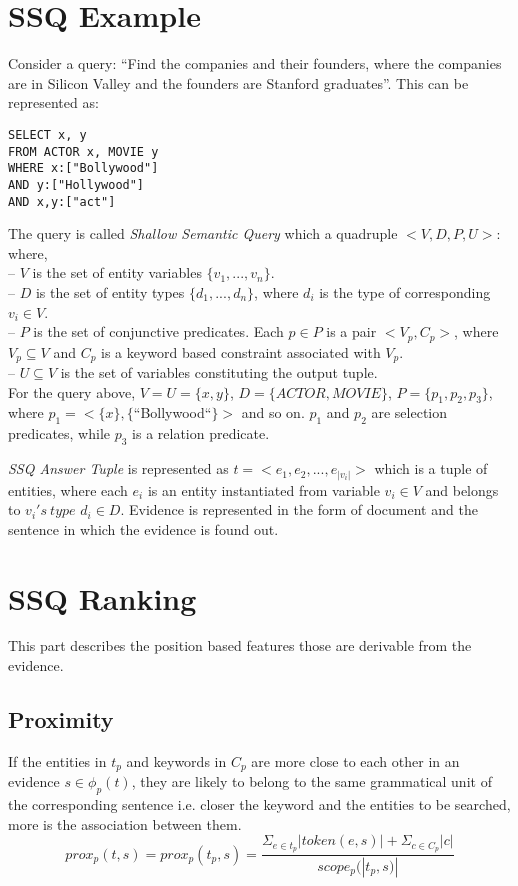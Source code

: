 \documentclass[11pt]{report}
\begin{document}
\section{SSQ Example}
Consider a query: ``Find the companies and their founders, where the companies are in Silicon Valley
and the founders are Stanford graduates''. This can be represented as:\\
\begin{verbatim}
SELECT x, y
FROM ACTOR x, MOVIE y
WHERE x:["Bollywood"]
AND y:["Hollywood"]
AND x,y:["act"]
\end{verbatim}
The query is called \textit{Shallow Semantic Query} which a quadruple $<V,D,P,U>$: where,\\
-- $V$ is the set of entity variables $\{v_{1},...,v_{n}\}$.\\
-- $D$ is the set of entity types $\{ d_{1},...,d_{n}\}$, where $d_{i}$ is the type of corresponding
$v_{i} \in V$. \\
-- $P$ is the set of conjunctive predicates. Each $p \in P$ is a pair $<V_{p}, C_{p}>$, where $V_{p} \subseteq V$
and $C_{p}$ is a keyword based constraint associated with $V_{p}$.\\
-- $U \subseteq V$ is the set of variables constituting the output tuple.\\

For the query above, $V=U=\{x,y\}$, $D=\{ACTOR, MOVIE\}$, $P=\{p_{1}, p_{2}, p_{3}\}$, where
$p_{1} = <\{x\},\{$``Bollywood``$\}>$ and so on. $p_{1}$ and $p_{2}$ are selection predicates, while
$p_{3}$ is a relation predicate.

\textit{SSQ Answer Tuple} is represented as $t=<e_{1}, e_{2},...,e_{|v_{i}|}>$ which is a tuple of entities, where each
$e_{i}$ is an entity instantiated from variable $v_{i} \in V$ and belongs to $v_{i}'s\ type$ $d_{i} \in D$. Evidence
is represented in the form of document and the sentence in which the evidence is found out. 

\section{SSQ Ranking}
This part describes the position based features those are derivable from the evidence.
\subsection{Proximity}
If the entities in $t_{p}$ and keywords in $C_{p}$ are more close to each other in an evidence $s \in \phi_{p}(t)$,
they are likely to belong to the same grammatical unit of the corresponding sentence i.e. closer the keyword and 
the entities to be searched, more is the association between them.
\begin{equation}
 prox_{p}(t,s)=prox_{p}(t_{p},s)=\frac{\Sigma_{e \in t_{p}} |token(e,s)| + \Sigma_{c \in C_{p}}|c|}{scope_{p}(|t_{p},s)|}
\end{equation}
\end{document}
